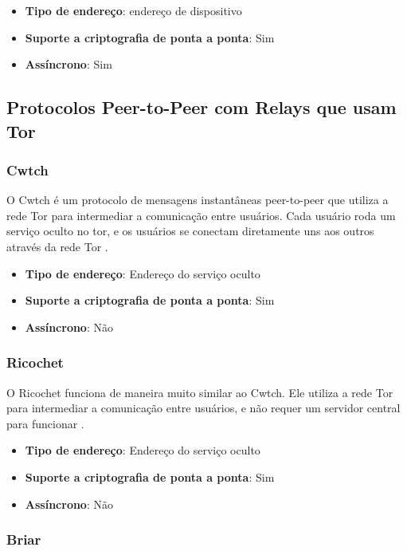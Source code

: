 \begin{itemize}
  \item \textbf{Tipo de endereço}: endereço de dispositivo
  \item \textbf{Suporte a criptografia de ponta a ponta}: Sim
  \item \textbf{Assíncrono}: Sim
\end{itemize}

\subsection{Protocolos Peer-to-Peer com Relays que usam Tor}

\subsubsection{Cwtch}

O Cwtch é um protocolo de mensagens instantâneas peer-to-peer que utiliza a rede Tor para intermediar a comunicação entre usuários. Cada usuário roda um serviço oculto no tor, e os usuários se conectam diretamente uns aos outros através da rede Tor \cite{cwtch}.

\begin{itemize}
  \item \textbf{Tipo de endereço}: Endereço do serviço oculto
  \item \textbf{Suporte a criptografia de ponta a ponta}: Sim
  \item \textbf{Assíncrono}: Não
\end{itemize}

\subsubsection{Ricochet}

O Ricochet funciona de maneira muito similar ao Cwtch. Ele utiliza a rede Tor para intermediar a comunicação entre usuários, e não requer um servidor central para funcionar \cite{ricochet}.

\begin{itemize}
  \item \textbf{Tipo de endereço}: Endereço do serviço oculto
  \item \textbf{Suporte a criptografia de ponta a ponta}: Sim
  \item \textbf{Assíncrono}: Não
\end{itemize}

\subsubsection{Briar}

